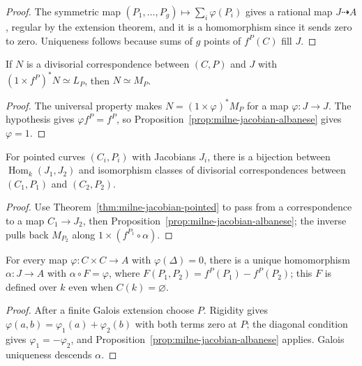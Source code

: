 \begin{proof}
The symmetric map $(P_1,\ldots,P_g)\mapsto\sum_i\varphi(P_i)$ gives a rational map $J\dashrightarrow A$, regular by the extension theorem, and it is a homomorphism since it sends zero to zero. Uniqueness follows because sums of $g$ points of $f^P(C)$ fill $J$.
\end{proof}

\begin{corollary}\label{cor:milne-jacobian-correspondence-unique}
If $N$ is a divisorial correspondence between $(C,P)$ and $J$ with $(1\times f^P)^*N\simeq L_P$, then $N\simeq M_P$.
\end{corollary}

\begin{proof}
The universal property makes $N=(1\times\varphi)^*M_P$ for a map $\varphi:J\to J$. The hypothesis gives $\varphi f^P=f^P$, so Proposition~\ref{prop:milne-jacobian-albanese} gives $\varphi=1$.
\end{proof}

\begin{corollary}\label{cor:milne-jacobian-hom-correspondence}
For pointed curves $(C_i,P_i)$ with Jacobians $J_i$, there is a bijection between $\operatorname{Hom}_k(J_1,J_2)$ and isomorphism classes of divisorial correspondences between $(C_1,P_1)$ and $(C_2,P_2)$.
\end{corollary}

\begin{proof}
Use Theorem~\ref{thm:milne-jacobian-pointed} to pass from a correspondence to a map $C_1\to J_2$, then Proposition~\ref{prop:milne-jacobian-albanese}; the inverse pulls back $M_{P_2}$ along $1\times(f^{P_1}\circ\alpha)$.
\end{proof}

\begin{proposition}\label{prop:milne-jacobian-albanese-no-point}
For every map $\varphi:C\times C\to A$ with $\varphi(\Delta)=0$, there is a unique homomorphism $\alpha:J\to A$ with $\alpha\circ F=\varphi$, where $F(P_1,P_2)=f^P(P_1)-f^P(P_2)$; this $F$ is defined over $k$ even when $C(k)=\varnothing$.
\end{proposition}

\begin{proof}
After a finite Galois extension choose $P$. Rigidity gives $\varphi(a,b)=\varphi_1(a)+\varphi_2(b)$ with both terms zero at $P$; the diagonal condition gives $\varphi_1=-\varphi_2$, and Proposition~\ref{prop:milne-jacobian-albanese} applies. Galois uniqueness descends $\alpha$.

\end{proof}

